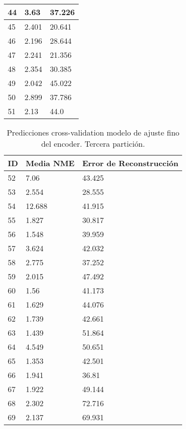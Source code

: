 \begin{table}[!ht]
\begin{tabular}{|l|l|l|}
        44 & 3.63 & 37.226 \\ \hline
        45 & 2.401 & 20.641 \\ \hline
        46 & 2.196 & 28.644 \\ \hline
        47 & 2.241 & 21.356 \\ \hline
        48 & 2.354 & 30.385 \\ \hline
        49 & 2.042 & 45.022 \\ \hline
        50 & 2.899 & 37.786 \\ \hline
        51 & 2.13 & 44.0 \\ \hline
    \end{tabular}
\end{table}

\begin{table}[!ht]
    \centering
    \caption{Predicciones cross-validation modelo de ajuste fino del encoder. Tercera partición.}
    \begin{tabular}{|l|l|l|}
    \hline
    \cellcolor{gray!25}\textbf{ID} & \cellcolor{gray!25}\textbf{Media NME} & \cellcolor{gray!25}\textbf{Error de Reconstrucción} \\ \hline
        52 & 7.06 & 43.425 \\ \hline
        53 & 2.554 & 28.555 \\ \hline
        54 & 12.688 & 41.915 \\ \hline
        55 & 1.827 & 30.817 \\ \hline
        56 & 1.548 & 39.959 \\ \hline
        57 & 3.624 & 42.032 \\ \hline
        58 & 2.775 & 37.252 \\ \hline
        59 & 2.015 & 47.492 \\ \hline
        60 & 1.56 & 41.173 \\ \hline
        61 & 1.629 & 44.076 \\ \hline
        62 & 1.739 & 42.661 \\ \hline
        63 & 1.439 & 51.864 \\ \hline
        64 & 4.549 & 50.651 \\ \hline
        65 & 1.353 & 42.501 \\ \hline
        66 & 1.941 & 36.81 \\ \hline
        67 & 1.922 & 49.144 \\ \hline
        68 & 2.302 & 72.716 \\ \hline
        69 & 2.137 & 69.931 \\ \hline

\end{tabular}
\end{table}

